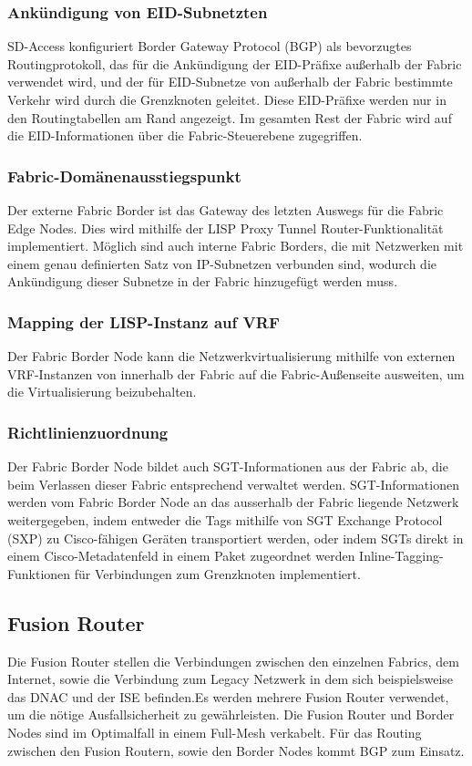 \subsubsection{Ankündigung von EID-Subnetzten}
SD-Access konfiguriert Border Gateway Protocol (BGP) als bevorzugtes Routingprotokoll, das für die Ankündigung der EID-Präfixe außerhalb der Fabric verwendet wird, und der für EID-Subnetze von außerhalb der Fabric bestimmte Verkehr wird durch die Grenzknoten geleitet. Diese EID-Präfixe werden nur in den Routingtabellen am Rand angezeigt. Im gesamten Rest der Fabric wird auf die EID-Informationen über die Fabric-Steuerebene zugegriffen.

\subsubsection{Fabric-Domänenausstiegspunkt}
Der externe Fabric Border ist das Gateway des letzten Auswegs für die Fabric Edge Nodes. Dies wird mithilfe der LISP Proxy Tunnel Router-Funktionalität implementiert. Möglich sind auch interne Fabric Borders, die mit Netzwerken mit einem genau definierten Satz von IP-Subnetzen verbunden sind, wodurch die Ankündigung dieser Subnetze in der Fabric hinzugefügt werden muss.

\subsubsection{Mapping der LISP-Instanz auf VRF}
Der Fabric Border Node kann die Netzwerkvirtualisierung mithilfe von externen VRF-Instanzen von innerhalb der Fabric auf die Fabric-Außenseite ausweiten, um die Virtualisierung beizubehalten.

\subsubsection{Richtlinienzuordnung}
Der Fabric Border Node bildet auch SGT-Informationen aus der Fabric ab, die beim Verlassen dieser Fabric entsprechend verwaltet werden. SGT-Informationen werden vom Fabric Border Node an das ausserhalb der Fabric liegende Netzwerk weitergegeben, indem entweder die Tags mithilfe von SGT Exchange Protocol (SXP) zu Cisco-fähigen Geräten transportiert werden, oder indem SGTs direkt in einem Cisco-Metadatenfeld in einem Paket zugeordnet werden Inline-Tagging-Funktionen für Verbindungen zum Grenzknoten implementiert.

\subsection{Fusion Router}
Die Fusion Router stellen die Verbindungen zwischen den einzelnen Fabrics, dem Internet, sowie die Verbindung zum Legacy Netzwerk in dem sich beispielsweise das DNAC und der ISE befinden.Es werden mehrere Fusion Router verwendet, um die nötige Ausfallsicherheit zu gewährleisten. Die Fusion Router und Border Nodes sind im Optimalfall in einem Full-Mesh verkabelt. Für das Routing zwischen den Fusion Routern, sowie den Border Nodes kommt BGP zum Einsatz.

